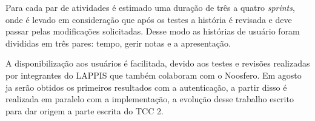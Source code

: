 Para cada par de atividades é estimado uma duração de três a quatro \textit{sprints}, onde é levado em consideração que após os testes a história é revisada e deve passar pelas modificações solicitadas. Desse modo as histórias de usuário foram divididas em três pares: tempo, gerir notas e a apresentação.

A disponibilização aos usuários é facilitada, devido aos testes e revisões realizadas por integrantes do LAPPIS que também colaboram com o Noosfero. Em agosto ja serão obtidos os primeiros resultados com a autenticação, a partir disso é realizada em paralelo com a implementação, a evolução desse trabalho escrito para dar origem a parte escrita do TCC 2.